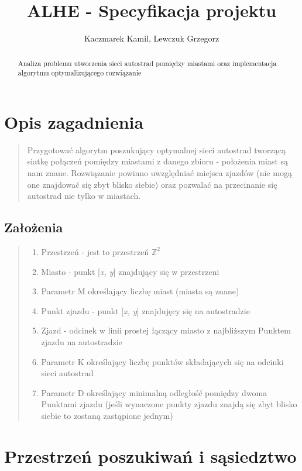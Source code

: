 \documentclass[a4paper]{article}
\title{ALHE - Specyfikacja projektu}
\author{Kaczmarek Kamil, Lewczuk Grzegorz}
\begin{document}
\maketitle

\begin{abstract}
Analiza problemu utworzenia sieci autostrad pomiędzy miastami oraz implementacja algorytmu optymalizującego rozwiązanie
\end{abstract}

\section{Opis zagadnienia}

\begin{quote}
Przygotować algorytm poszukujący optymalnej sieci autostrad tworzącą siatkę połączeń pomiędzy miastami z danego zbioru - położenia miast są nam znane. Rozwiązanie powinno uwzględniać miejsca zjazdów (nie mogą one znajdować się zbyt blisko siebie) oraz pozwalać na przecinanie się autostrad nie tylko w miastach.
\end{quote}

\subsection{Założenia}
\begin{quote}
\begin{enumerate}
\item Przestrzeń - jest to przestrzeń $\mathbb{Z}^2$
\item Miasto - punkt [\textit{x, y}] znajdujący się w przestrzeni
\item Parametr M określający liczbę miast (miasta są znane)
\item Punkt zjazdu - punkt [\textit{x, y}] znajdujęcy się na autostradzie 
\item Zjazd - odcinek w linii prostej łączący miasto z najbliższym Punktem zjazdu na autostradzie
\item Parametr K określający liczbę punktów składających się na odcinki sieci autostrad
\item Parametr D określający minimalną odległość pomiędzy dwoma Punktami zjazdu (jeśli wynaczone punkty zjazdu znajdą się zbyt blisko siebie to zostaną zastąpione jednym)
\end{enumerate}
\end{quote}
\section{Przestrzeń poszukiwań i sąsiedztwo}
\end{document}
